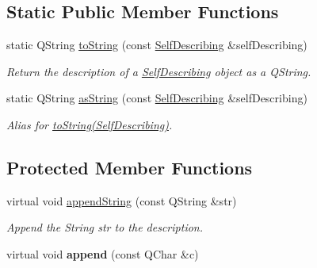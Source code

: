 \subsection*{Static Public Member Functions}
\begin{DoxyCompactItemize}
\item 
static Q\-String \hyperlink{class_hamcrest_qt_1_1_string_description_aa7cffb8dd9c5502076dd58554395b906}{to\-String} (const \hyperlink{class_hamcrest_qt_1_1_self_describing}{Self\-Describing} \&self\-Describing)
\begin{DoxyCompactList}\small\item\em Return the description of a \hyperlink{class_hamcrest_qt_1_1_self_describing}{Self\-Describing} object as a {\ttfamily Q\-String}. \end{DoxyCompactList}\item 
\hypertarget{class_hamcrest_qt_1_1_string_description_a426e3c8524d7e72075aa3e8b974b5bc8}{static Q\-String \hyperlink{class_hamcrest_qt_1_1_string_description_a426e3c8524d7e72075aa3e8b974b5bc8}{as\-String} (const \hyperlink{class_hamcrest_qt_1_1_self_describing}{Self\-Describing} \&self\-Describing)}\label{class_hamcrest_qt_1_1_string_description_a426e3c8524d7e72075aa3e8b974b5bc8}

\begin{DoxyCompactList}\small\item\em Alias for \hyperlink{}{to\-String(\-Self\-Describing)}. \end{DoxyCompactList}\end{DoxyCompactItemize}
\subsection*{Protected Member Functions}
\begin{DoxyCompactItemize}
\item 
virtual void \hyperlink{class_hamcrest_qt_1_1_string_description_a2e27da55b34506521df58b3e2f22a48c}{append\-String} (const Q\-String \&str)
\begin{DoxyCompactList}\small\item\em Append the String {\itshape str} to the description. \end{DoxyCompactList}\item 
\hypertarget{class_hamcrest_qt_1_1_string_description_ad259aeffbdd7d6d51cd636ed98b3bd38}{virtual void {\bfseries append} (const Q\-Char \&c)}\label{class_hamcrest_qt_1_1_string_description_ad259aeffbdd7d6d51cd636ed98b3bd38}

\end{DoxyCompactItemize}



